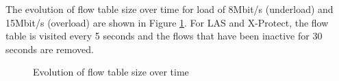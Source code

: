 \documentclass[preprint,12pt]{elsarticle}
\begin{document}
The evolution of  flow table size over time for load of 8Mbit/s (underload) and 15Mbit/s (overload) are shown in Figure \ref{fig:result11}. For LAS and X-Protect, the flow table is visited  every 5 seconds  and the flows that have been inactive for 30 seconds are removed. %

\begin{figure}[ht]
  \centering
  \caption{Evolution of flow table size over time}
  \label{fig:result11}
\end{figure}

\end{document}
